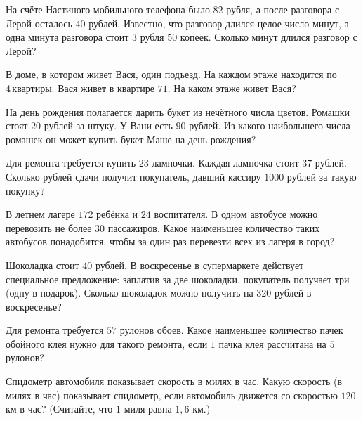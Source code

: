 %
%
%
%
%		
%
%
\begin{homework}[number=1]
	\begin{listofex}
	\item 	{}
	\item {}
	\item {}
	\item На счёте Настиного мобильного телефона было \( 82 \) рубля, а после разговора с Лерой осталось \( 40 \) рублей. Известно, что разговор длился целое число минут, а одна минута разговора стоит \( 3 \) рубля \( 50 \) копеек. Сколько минут длился разговор с Лерой?
	\item В доме, в котором живет Вася, один подъезд. На каждом этаже находится по 4 квартиры. Вася живет в квартире \( 71 \). На каком этаже живет Вася?
	\item На день рождения полагается дарить букет из нечётного числа цветов. Ромашки стоят \( 20 \) рублей за штуку. У Вани есть \( 90 \) рублей. Из какого наибольшего числа ромашек он может купить букет Маше на день рождения?
	\item Для ремонта требуется купить \( 23 \) лампочки. Каждая лампочка стоит \( 37 \) рублей. Сколько рублей сдачи получит покупатель, давший кассиру \( 1000 \) рублей за такую покупку?
	\item В летнем лагере \( 172 \) ребёнка и \( 24 \) воспитателя. В одном автобусе можно перевозить не более \( 30 \) пассажиров. Какое наименьшее количество таких автобусов понадобится, чтобы за один раз перевезти всех из лагеря в город?
	\item Шоколадка стоит \( 40 \) рублей. В воскресенье в супермаркете действует специальное предложение: заплатив за две шоколадки, покупатель получает три (одну в подарок). Сколько шоколадок можно получить на \( 320 \) рублей в воскресенье?
	\item Для ремонта требуется \( 57 \) рулонов обоев. Какое наименьшее количество пачек обойного клея нужно для такого ремонта, если \( 1 \) пачка клея рассчитана на \( 5 \) рулонов?
	\item Спидометр автомобиля показывает скорость в милях в час. Какую скорость (в милях в час) показывает спидометр, если автомобиль движется со скоростью \( 120 \) км в час? (Считайте, что \( 1  \) миля равна \( 1,6  \) км.)

\end{listofex}
\end{homework}
